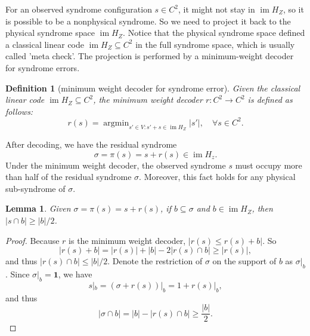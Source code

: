 \documentclass[twoside,english,aps,showpacs,pra,superscriptaddress]{revtex4-2}
\DeclareMathOperator{\im}{im}
\DeclareMathOperator*{\argmin}{argmin}
\renewcommand{\vec}{\boldsymbol}
\newtheorem{lemma}{Lemma}
\newtheorem{definition}{Definition}
\begin{document}
For an observed syndrome configuration $s \in C^2$, it might not stay in $\im H_Z$, so it is possible to be a nonphysical syndrome. So we need to project it back to the physical syndrome space $\im H_Z$. 
Notice that the physical syndrome space defined a classical linear code $\im H_Z \subseteq C^2$ in the full syndrome space, which is usually called 'meta check'.
The projection is performed by a minimum-weight decoder for syndrome errors. 
\begin{definition}[minimum weight decoder for syndrome error]
    Given the classical linear code $\im H_Z \subseteq C^2$, the minimum weight decoder $r: C^2 \rightarrow C^2$ is defined as follows: 
    \begin{equation}
        r(s) = \argmin_{s' \in V:s'+s\in \im H_Z}|s'|, \quad \forall s\in C^2.
    \end{equation}
\end{definition}
After decoding, we have the residual syndrome
\begin{equation}
    \sigma = \pi(s) = s + r (s) \in \im H_z.
\end{equation}
Under the minimum weight decoder, the observed syndrome $s$ must occupy more than half of the residual syndrome $\sigma$. Moreover, this fact holds for any physical sub-syndrome of $\sigma$.
\begin{lemma} \label{lemma:half-weight}
    Given $\sigma = \pi(s) = s+r(s)$, if $b \subseteq \sigma$ and $b \in \im H_Z$, then $|s \cap b| \geq |b|/2$.
\end{lemma}
\begin{proof}
    Because $r$ is the minimum weight decoder, $|r(s) \leq r(s)+b|$.
    So
    \begin{equation}
        |r(s)+b| = |r(s)| + |b| - 2|r(s) \cap b| \geq |r(s)|, 
    \end{equation}
    and thus $|r(s)\cap b| \leq |b|/2$.
    Denote the restriction of $\sigma$ on the support of $b$ as $\sigma|_b$. Since $\sigma|_b = \vec 1$, we have
    \begin{equation}
        s|_b = (\sigma + r(s))|_b = 1 + r(s)|_b, 
    \end{equation}
    and thus 
    \begin{equation}
        |\sigma \cap b| = |b| - |r(s) \cap b| \geq \frac{|b|}{2}.
    \end{equation}
\end{proof}
\end{document}
